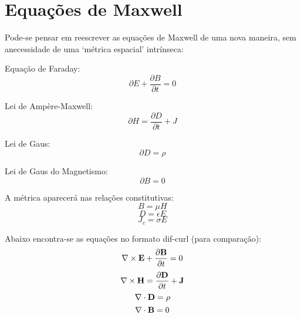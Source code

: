 \documentclass [a4paper,12pt]{article}
\begin{document}
\section{Equações de Maxwell}
Pode-se pensar em reescrever as equações de Maxwell de uma nova maneira, sem anecessidade de uma `métrica espacial' intrínseca:

Equação de Faraday:
$$
\partial E + \frac{\partial{B}}{\partial{t}} = 0
$$

Lei de Ampère-Maxwell:
$$
\partial H = \frac{\partial{D}}{\partial{t}} + J
$$

Lei de Gaus:
$$
\partial{D} = \rho
$$

Lei de Gaus do Magnetismo:
$$
\partial{B} = 0
$$

A métrica aparecerá nas relações constitutivas:
$$
B=\mu H
$$
$$
D = \epsilon E
$$
$$
J_c=\sigma E
$$



Abaixo encontra-se as equações no formato dif-curl (para comparação):
$$
\nabla\times\textbf E + \frac{\partial\textbf B}{\partial t} = 0
$$
$$
\nabla\times\textbf H = \frac{\partial\textbf D}{\partial t} + \textbf J
$$
$$
\nabla\cdot\textbf D = \rho
$$
$$
\nabla\cdot\textbf B = 0
$$
\end{document}
